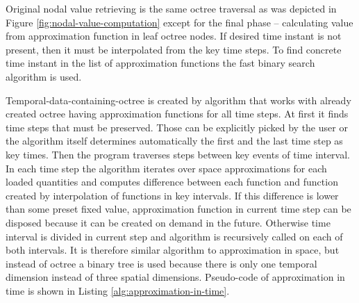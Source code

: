 Original nodal value retrieving is the same octree traversal as was depicted in Figure \ref{fig:nodal-value-computation} except for the final phase -- calculating value from approximation function in leaf octree nodes. If desired time instant is not present, then it must be interpolated from the key time steps. To find concrete time instant in the list of approximation functions the fast binary search algorithm is used.

Temporal-data-containing-octree is created by algorithm that works with already created octree having approximation functions for all time steps. At first it finds time steps that must be preserved. Those can be explicitly picked by the user or the algorithm itself determines automatically the first and the last time step as key times. Then the program traverses steps between key events of time interval. In each time step the algorithm iterates over space approximations for each loaded quantities and computes difference between each function and function created by interpolation of functions in key intervals. If this difference is lower than some preset fixed value, approximation function in current time step can be disposed because it can be created on demand in the future. Otherwise time interval is divided in current step and algorithm is recursively called on each of both intervals. It is therefore similar algorithm to approximation in space, but instead of octree a binary tree is used because there is only one temporal dimension instead of three spatial dimensions. Pseudo-code of approximation in time is shown in Listing \ref{alg:approximation-in-time}.

